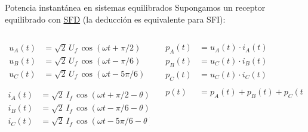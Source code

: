 \documentclass[aspectratio=169, usenames,svgnames,dvipsnames]{beamer}
\begin{document}
\begin{frame}{Potencia instantánea en sistemas equilibrados}
    Supongamos un \alert{receptor equilibrado} con \hyperlink{diapo:triangulo_SFD}{SFD} (la deducción es equivalente para SFI):     

    \vspace{2mm}
    \begin{columns}
    \begin{column}{0.5\columnwidth}
    \begin{align*}
      u_A(t) &= \sqrt{2} \, U_f \, \cos(\omega t + \pi/2)\\
      u_B(t) &= \sqrt{2} \, U_f \, \cos(\omega t - \pi/6)\\
      u_C(t) &= \sqrt{2} \, U_f \, \cos(\omega t - 5\pi/6)
    \end{align*}
    
    \begin{align*}
      i_A(t) &= \sqrt{2} \, I_f \, \cos(\omega t + \pi/2 - \theta)\\
      i_B(t) &= \sqrt{2} \, I_f \, \cos(\omega t - \pi/6 - \theta)\\
      i_C(t) &= \sqrt{2} \, I_f \, \cos(\omega t - 5\pi/6 - \theta)
    \end{align*}
    \end{column}
    
    \begin{column}{0.5\columnwidth}
    \begin{align*}
      p_A(t) &= u_A(t) \cdot i_A(t)\\
      p_B(t) &= u_C(t) \cdot i_B(t)\\
      p_C(t) &= u_C(t) \cdot i_C(t)\\
      \\
      p(t) &= p_A(t) + p_B(t) + p_C(t)
    \end{align*}
    \end{column}
    \end{columns}
\end{frame}

\end{document}
